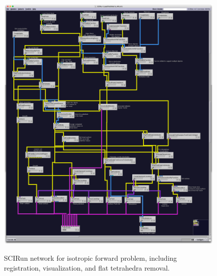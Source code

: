 \begin{figure}[p]
\begin{center}
\includegraphics[width=\textwidth]{Figures/iso_network.png}\\
\caption{SCIRun network for isotropic forward problem, including registration, visualization, and flat tetrahedra removal.}
\label{fig:isofornet}
\end{center}
\end{figure}

